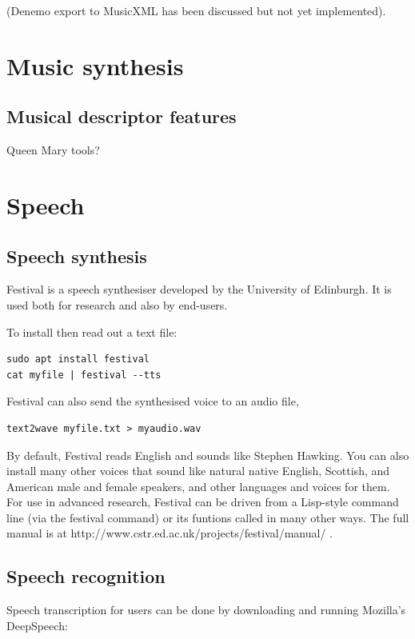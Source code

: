 \documentclass[oneside,english]{scrbook}
\begin{document}
(Denemo export to MusicXML has been discussed but not yet implemented).
\chapter{Music synthesis}


\section{Musical descriptor features}
Queen Mary tools?

\chapter{Speech}

\section{Speech synthesis}

Festival is a speech synthesiser developed by the University of Edinburgh. It is used both for research and also by end-users.

To install then read out a text file:

\begin{lstlisting}
sudo apt install festival
cat myfile | festival --tts
\end{lstlisting}

Festival can also send the synthesised voice to an audio file,
\begin{lstlisting}
text2wave myfile.txt > myaudio.wav
\end{lstlisting}

By default, Festival reads English and sounds like Stephen Hawking. You can also install many other voices that sound like natural native English, Scottish, and American male and female speakers, and other languages and voices for them.  For use in advanced research, Festival can be driven from a Lisp-style command line (via the festival command) or its funtions called in many other ways.  The full manual is at http://www.cstr.ed.ac.uk/projects/festival/manual/ .

\section{Speech recognition}

Speech transcription for users can be done by downloading and running Mozilla's  DeepSpeech:
\end{document}
